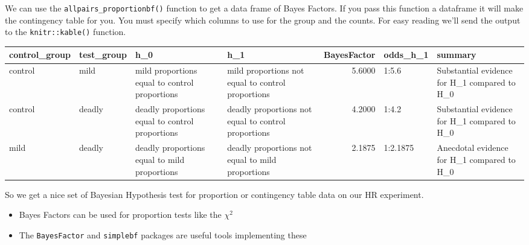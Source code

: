 \documentclass[
]{book}
\newenvironment{Shaded}{\begin{snugshade}}{\end{snugshade}}
\newcommand{\DataTypeTok}[1]{\textcolor[rgb]{0.13,0.29,0.53}{#1}}
\newcommand{\KeywordTok}[1]{\textcolor[rgb]{0.13,0.29,0.53}{\textbf{#1}}}
\newcommand{\NormalTok}[1]{#1}
\newcommand{\OperatorTok}[1]{\textcolor[rgb]{0.81,0.36,0.00}{\textbf{#1}}}
\newcommand{\StringTok}[1]{\textcolor[rgb]{0.31,0.60,0.02}{#1}}
\providecommand{\tightlist}{%
  \setlength{\itemsep}{0pt}\setlength{\parskip}{0pt}}
\newenvironment{roundup}
{ \begin{tcolorbox}[colbacktitle=yellow!50!white,
title=Round Up,coltitle=black,
fonttitle=\bfseries] }
{  \end{tcolorbox} }
\begin{document}
We can use the \texttt{allpairs\_proportionbf()} function to get a data frame of Bayes Factors. If you pass this function a dataframe it will make the contingency table for you. You must specify which columns to use for the group and the counts. For easy reading we'll send the output to the \texttt{knitr::kable()} function.

\begin{Shaded}
\end{Shaded}

\begin{tabular}{l|l|l|l|r|l|l}
\hline
control\_group & test\_group & h\_0 & h\_1 & BayesFactor & odds\_h\_1 & summary\\
\hline
control & mild & mild proportions equal to control proportions & mild proportions not equal to control proportions & 5.6000 & 1:5.6 & Substantial evidence for H\_1 compared to H\_0\\
\hline
control & deadly & deadly proportions equal to control proportions & deadly proportions not equal to control proportions & 4.2000 & 1:4.2 & Substantial evidence for H\_1 compared to H\_0\\
\hline
mild & deadly & deadly proportions equal to mild proportions & deadly proportions not equal to mild proportions & 2.1875 & 1:2.1875 & Anecdotal evidence for H\_1 compared to H\_0\\
\hline
\end{tabular}

So we get a nice set of Bayesian Hypothesis test for proportion or contingency table data on our HR experiment.

\begin{roundup}
\begin{itemize}
\tightlist
\item
  Bayes Factors can be used for proportion tests like the \(\chi^2\)
\item
  The \texttt{BayesFactor} and \texttt{simplebf} packages are useful tools implementing these
\end{itemize}
\end{roundup}

  
\end{document}
